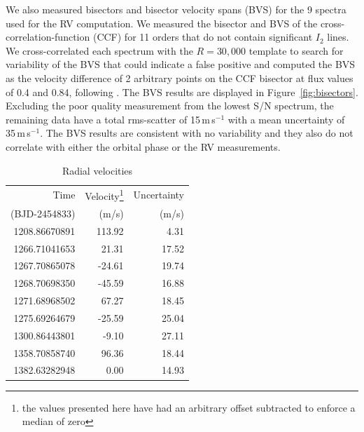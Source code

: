 \documentclass[apjl]{emulateapj}
\begin{document}
We also measured bisectors and bisector velocity spans (BVS) for the 9 spectra used for the RV computation. We measured the bisector and BVS of the cross-correlation-function (CCF) for 11 orders that do not contain significant $I_2$ lines. We cross-correlated each spectrum with the $R=30,000$ template to search for variability of the BVS that could indicate a false positive and computed the BVS as the velocity difference of 2 arbitrary points on the CCF bisector at flux values of 0.4 and 0.84, following \citet{hatzes98}. The BVS results are displayed in Figure~\ref{fig:bisectors}. Excluding the poor
quality measurement from the lowest S/N spectrum, the remaining data have a total rms-scatter of 15\,m\,s$^{-1}$ with a mean uncertainty of 35\,m\,s$^{-1}$. The BVS results are consistent with no variability and they also do not correlate with either the orbital phase or the RV measurements.





\begin{table}\label{tab:rv}
\centering
\caption{Radial velocities}
\begin{tabular}{r r r}
Time & Velocity\footnote{the values presented here have had an arbitrary offset subtracted to enforce a median of zero}  & Uncertainty \\
(BJD-2454833) & (m/s) & (m/s)\\
\hline
1208.86670891	&	113.92 & 4.31\\
1266.71041653	& 21.31&17.52\\
1267.70865078		&	-24.61 &19.74\\
1268.70698350		&	-45.59&16.88\\
1271.68968502		&	67.27&18.45\\
1275.69264679	&	-25.59&25.04\\
1300.86443801 & -9.10&27.11\\
1358.70858740 & 96.36&18.44\\
1382.63282948 & 0.00&14.93\\
\hline
\end{tabular}
\end{table}
\end{document}
